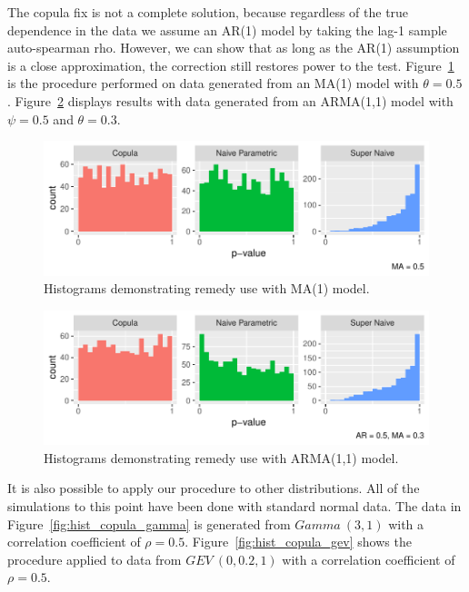 \documentclass[12pt, letterpaper, titlepage]{article}
\begin{document}
The copula fix is not a complete solution, because regardless of the true dependence in the data
we assume an AR(1) model by taking the lag-1 sample auto-spearman rho. However, we can 
show that as long as the AR(1) assumption is a close approximation, the correction still restores power to the test.
Figure~\ref{fig:hist_copula_ma1} is the procedure performed on data generated from 
an MA(1) model with $\theta = 0.5$. Figure~\ref{fig:hist_copula_arma} displays results with 
data generated from an ARMA(1,1) model with $\psi = 0.5$ and $\theta = 0.3$. 

\begin{figure}[tbp]
  \centering
  \includegraphics{hist_copula_ma1}
  \caption{Histograms demonstrating remedy use with MA(1) model.}
  \label{fig:hist_copula_ma1}
\end{figure}

\begin{figure}[tbp]
  \centering
  \includegraphics{hist_copula_arma}
  \caption{Histograms demonstrating remedy use with ARMA(1,1) model.}
  \label{fig:hist_copula_arma}
\end{figure}

It is also possible to apply our procedure to other distributions. All of the simulations
to this point have been done with standard normal data. The data in Figure~\ref{fig:hist_copula_gamma} 
is generated from $Gamma ~ (3,1)$ with a correlation coefficient of $\rho = 0.5$. Figure~\ref{fig:hist_copula_gev}
shows the procedure applied to data from $GEV ~ (0, 0.2, 1)$ with a correlation coefficient of $\rho = 0.5$. 
\end{document}
